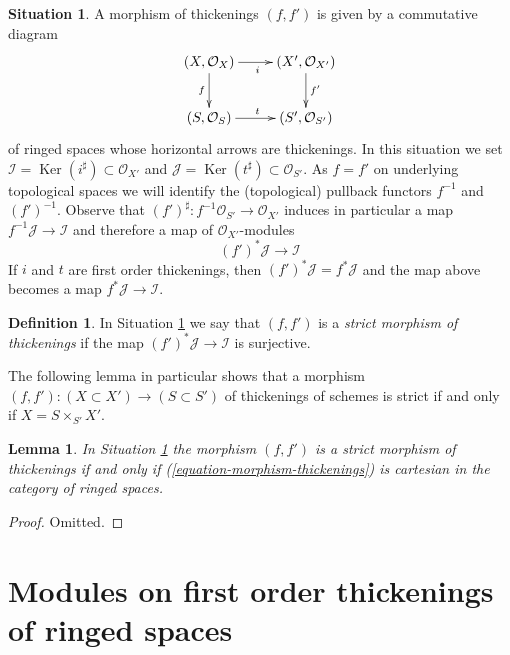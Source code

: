 \documentclass{stacks-project}
\theoremstyle{plain}
\newtheorem{lemma}[subsection]{Lemma}
\theoremstyle{definition}
\newtheorem{definition}[subsection]{Definition}
\newtheorem{situation}[subsection]{Situation}
\theoremstyle{remark}
\numberwithin{equation}{subsection}
\def\Ker{\mathop{\mathrm{Ker}}}
\begin{document}
\begin{situation}
\label{situation-morphism-thickenings}
A morphism of thickenings $(f, f')$ is given by a commutative diagram
\begin{equation}
\label{equation-morphism-thickenings}
\vcenter{
\xymatrix{
(X, \mathcal{O}_X) \ar[r]_i \ar[d]_f & (X', \mathcal{O}_{X'}) \ar[d]^{f'} \\
(S, \mathcal{O}_S) \ar[r]^t & (S', \mathcal{O}_{S'})
}
}
\end{equation}
of ringed spaces whose horizontal arrows are thickenings. In this
situation we set
$\mathcal{I} = \Ker(i^\sharp) \subset \mathcal{O}_{X'}$ and
$\mathcal{J} = \Ker(t^\sharp) \subset \mathcal{O}_{S'}$.
As $f = f'$ on underlying topological spaces we will identify
the (topological) pullback functors $f^{-1}$ and $(f')^{-1}$.
Observe that $(f')^\sharp : f^{-1}\mathcal{O}_{S'} \to \mathcal{O}_{X'}$
induces in particular a map $f^{-1}\mathcal{J} \to \mathcal{I}$
and therefore a map of $\mathcal{O}_{X'}$-modules
$$
(f')^*\mathcal{J} \longrightarrow \mathcal{I}
$$
If $i$ and $t$ are first order thickenings, then
$(f')^*\mathcal{J} = f^*\mathcal{J}$ and the map above becomes a
map $f^*\mathcal{J} \to \mathcal{I}$.
\end{situation}

\begin{definition}
\label{definition-strict-morphism-thickenings}
In Situation \ref{situation-morphism-thickenings} we say that $(f, f')$ is a
{\it strict morphism of thickenings}
if the map $(f')^*\mathcal{J} \longrightarrow \mathcal{I}$ is surjective.
\end{definition}

\noindent
The following lemma in particular shows that a morphism
$(f, f') : (X \subset X') \to (S \subset S')$ of
thickenings of schemes is strict if and only if $X = S \times_{S'} X'$.

\begin{lemma}
\label{lemma-strict-morphism-thickenings}
In Situation \ref{situation-morphism-thickenings} the morphism $(f, f')$
is a strict morphism of thickenings if and only if
(\ref{equation-morphism-thickenings}) is cartesian in the category
of ringed spaces.
\end{lemma}

\begin{proof}
Omitted.
\end{proof}




\section{Modules on first order thickenings of ringed spaces}
\label{section-modules-thickenings}
\end{document}
